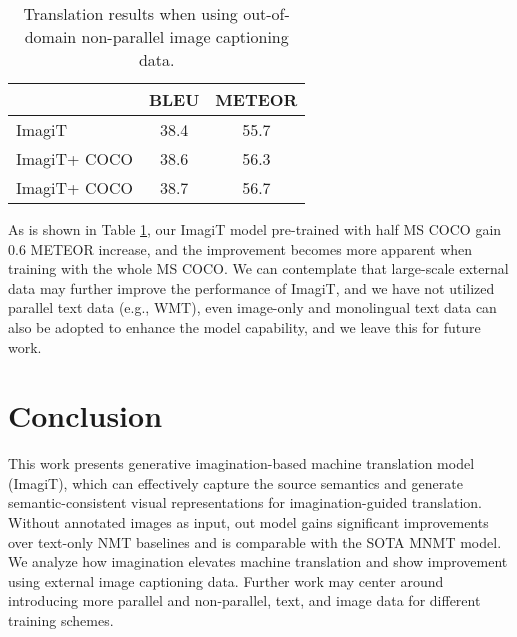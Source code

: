 \documentclass[11pt]{article}
\newcommand{\method}{ImagiT\xspace}
\begin{document}
\begin{table}[!h]
\centering
\begin{tabular}{l|cc}
\hline
              & BLEU     & METEOR    \\ \hline
\method & 38.4  & 55.7 \\ \hline
\method + COCO& 38.6 & 56.3 \\ \hline
\method + COCO& 38.7 & 56.7 \\
\hline
\end{tabular}
\caption{Translation results when using out-of-domain non-parallel image captioning data.}
\label{table3}
\end{table}

As is shown in Table \ref{table3}, our \method model pre-trained with half MS COCO gain 0.6 METEOR increase, and the improvement becomes more apparent when training with the whole MS COCO. We can contemplate that large-scale external data may further improve the performance of \method, and we have not utilized parallel text data (e.g., WMT), even image-only and monolingual text data can also be adopted to enhance the model capability, and we leave this for future work. 
\section{Conclusion}
\label{sec:conclusion}
This work presents generative imagination-based machine translation model (\method), which can effectively capture the source semantics and generate semantic-consistent visual representations for imagination-guided translation. Without annotated images as input, out model gains significant improvements over text-only NMT baselines and is comparable with the SOTA MNMT model. We analyze how imagination elevates machine translation and show improvement using external image captioning data. Further work may center around introducing more parallel and non-parallel, text, and image data for different training schemes.  
\end{document}
